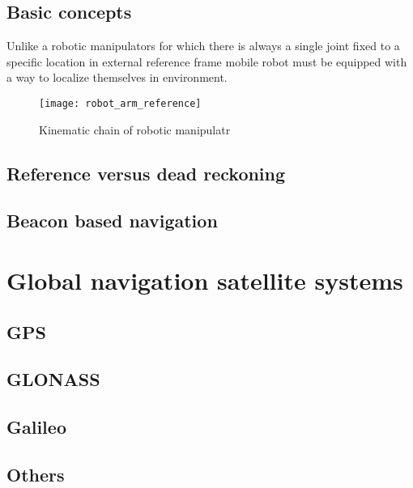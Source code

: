 \subsection{Basic concepts}
Unlike a robotic manipulators for which there is always a single joint fixed to a specific
location in external reference frame mobile robot must be equipped with a way to localize
themselves in environment.
\begin{figure}[hb]
	\texttt{[image: robot\_arm\_reference]}
	\caption{Kinematic chain of robotic manipulatr}
\end{figure}


\subsection{Reference versus dead reckoning}

\subsection{Beacon based navigation}


\section{Global navigation satellite systems}

\subsection{GPS}

\subsection{GLONASS}

\subsection{Galileo}

\subsection{Others}





